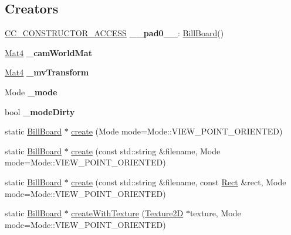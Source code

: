 \subsection*{Creators}
\begin{DoxyCompactItemize}
\item 
\mbox{\label{classBillBoard_ae5f8a8ff2f781a6046a4d4edd379357e}} 
\hyperlink{_2cocos2d_2cocos_2base_2ccConfig_8h_a25ef1314f97c35a2ed3d029b0ead6da0}{C\+C\+\_\+\+C\+O\+N\+S\+T\+R\+U\+C\+T\+O\+R\+\_\+\+A\+C\+C\+E\+SS} {\bfseries \+\_\+\+\_\+pad0\+\_\+\+\_\+}\+: \hyperlink{classBillBoard}{Bill\+Board}()
\item 
\mbox{\label{classBillBoard_a7ddf1053ff2b8ec9d27338071dee34b9}} 
\hyperlink{classMat4}{Mat4} {\bfseries \+\_\+cam\+World\+Mat}
\item 
\mbox{\label{classBillBoard_a7a18d3c92c9d7d97f7661b8a7056c086}} 
\hyperlink{classMat4}{Mat4} {\bfseries \+\_\+mv\+Transform}
\item 
\mbox{\label{classBillBoard_a61ead54384fbcf86638984c3145e1f9e}} 
Mode {\bfseries \+\_\+mode}
\item 
\mbox{\label{classBillBoard_accec520f24062915a185601c2c198cc3}} 
bool {\bfseries \+\_\+mode\+Dirty}
\item 
static \hyperlink{classBillBoard}{Bill\+Board} $\ast$ \hyperlink{classBillBoard_ae87c60e6d7278f55d836adb09281a286}{create} (Mode mode=Mode\+::\+V\+I\+E\+W\+\_\+\+P\+O\+I\+N\+T\+\_\+\+O\+R\+I\+E\+N\+T\+ED)
\item 
static \hyperlink{classBillBoard}{Bill\+Board} $\ast$ \hyperlink{classBillBoard_a99096279efac611e2d76734eff303672}{create} (const std\+::string \&filename, Mode mode=Mode\+::\+V\+I\+E\+W\+\_\+\+P\+O\+I\+N\+T\+\_\+\+O\+R\+I\+E\+N\+T\+ED)
\item 
static \hyperlink{classBillBoard}{Bill\+Board} $\ast$ \hyperlink{classBillBoard_aba3108c387dfb5290021e73aaa73557c}{create} (const std\+::string \&filename, const \hyperlink{classRect}{Rect} \&rect, Mode mode=Mode\+::\+V\+I\+E\+W\+\_\+\+P\+O\+I\+N\+T\+\_\+\+O\+R\+I\+E\+N\+T\+ED)
\item 
static \hyperlink{classBillBoard}{Bill\+Board} $\ast$ \hyperlink{classBillBoard_a60cefc735da0b8289c37c1424c1ed301}{create\+With\+Texture} (\hyperlink{classTexture2D}{Texture2D} $\ast$texture, Mode mode=Mode\+::\+V\+I\+E\+W\+\_\+\+P\+O\+I\+N\+T\+\_\+\+O\+R\+I\+E\+N\+T\+ED)

\end{DoxyCompactItemize}
